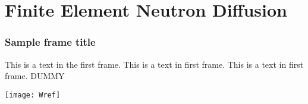 \section{Finite Element Neutron Diffusion}
\label{sec:neutronDiffusion}

\begin{frame}
  \frametitle{Sample frame title}
  This is a text in the first frame. This is a text in first frame. This is a
  text in first frame. DUMMY


  \begin{center}
    \texttt{[image: Wref]}
  \end{center}

\end{frame}
